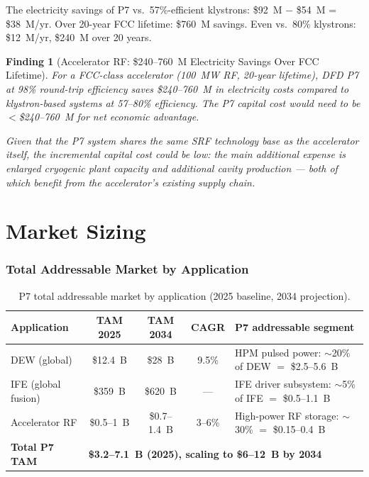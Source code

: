 \documentclass[11pt]{article}
\newtheorem{finding}{Finding}
\begin{document}
The electricity savings of P7 vs.\ 57\%-efficient klystrons:
\$92~M $-$ \$54~M = \$38~M/yr. Over 20-year FCC lifetime: \$760~M savings.
Even vs.\ 80\% klystrons: \$12~M/yr, \$240~M over 20 years.

\begin{finding}[Accelerator RF: \$240--760~M Electricity Savings Over FCC Lifetime]
\label{find:FCC-savings}
For a FCC-class accelerator (100~MW RF, 20-year lifetime), DFD P7 at
98\% round-trip efficiency saves \$240--760~M in electricity costs
compared to klystron-based systems at 57--80\% efficiency. The P7
capital cost would need to be $<$\$240--760~M for net economic advantage.

Given that the P7 system shares the same SRF technology base as the
accelerator itself, the incremental capital cost could be low: the
main additional expense is enlarged cryogenic plant capacity and
additional cavity production --- both of which benefit from the
accelerator's existing supply chain.
\end{finding}

\part{Market Sizing}
\label{part:market}

\section{Total Addressable Market by Application}

\begin{table}[h]
\centering
\caption{P7 total addressable market by application (2025 baseline,
  2034 projection).}
\label{tab:TAM}
\begin{tabular}{@{}p{3.5cm}cccp{3.5cm}@{}}
\toprule
Application & TAM 2025 & TAM 2034 & CAGR & P7 addressable segment \\
\midrule
DEW (global) & \$12.4~B & \$28~B & 9.5\% & HPM pulsed power: $\sim$20\%
  of DEW $=$ \$2.5--5.6~B \\
IFE (global fusion) & \$359~B & \$620~B & --- & IFE driver subsystem:
  $\sim$5\% of IFE $=$ \$0.5--1.1~B \\
Accelerator RF & \$0.5--1~B & \$0.7--1.4~B & 3--6\% & High-power RF
  storage: $\sim$30\% $=$ \$0.15--0.4~B \\
\midrule
\textbf{Total P7 TAM} & \multicolumn{4}{l}{\textbf{\$3.2--7.1~B (2025),
  scaling to \$6--12~B by 2034}} \\
\bottomrule
\end{tabular}
\end{table}
\end{document}
